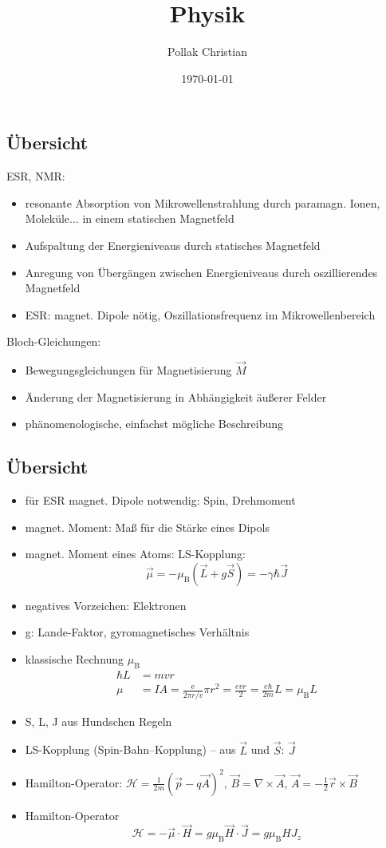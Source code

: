 \documentclass[
	a4paper,%
	twoside,%
	index=totoc,
	parskip=half,
 	chapterprefix,%
	headsepline,%
	13pt,%
	BCOR5mm,%
	fleqn,%
  openany,%
  ngerman
]{scrbook}
\title{Physik}
\author{Pollak Christian}
\date{\today}
\newcommand{\mb}{\mu_\mathrm{B}}
\begin{document}
	

\subsection{Übersicht}
ESR, NMR:
\begin{itemize}
\item resonante Absorption von Mikrowellenstrahlung durch paramagn. Ionen, Moleküle$\dots$ in einem statischen Magnetfeld
\item Aufspaltung der Energieniveaus durch statisches Magnetfeld
\item Anregung von Übergängen zwischen Energieniveaus durch oszillierendes Magnetfeld
\item ESR: magnet. Dipole nötig, Oszillationsfrequenz im Mikrowellenbereich
\end{itemize}

Bloch-Gleichungen:
\begin{itemize}
\item Bewegungsgleichungen für Magnetisierung $\vec M$
\item Änderung der Magnetisierung in Abhängigkeit äußerer Felder
\item phänomenologische, einfachst mögliche Beschreibung
\end{itemize}


\subsection{Übersicht}

\begin{itemize}
\item für ESR magnet. Dipole notwendig: Spin, Drehmoment
\item magnet. Moment: Maß für die Stärke eines Dipols
\item magnet. Moment eines Atoms: LS-Kopplung: 
\begin{equation}
\vec \mu = - \mb \left(\vec L + g \vec S\right) = -\gamma \hbar \vec J
\end{equation}
\item negatives Vorzeichen: Elektronen
\item g: Lande-Faktor, gyromagnetisches Verhältnis
\item klassische Rechnung $\mb$
\begin{align}
\hbar L &= m v r \\
\mu &= I A = \frac{\mathrm{e}}{2\pi r/v} \pi r^2 = \frac{evr}{2} = \frac{e \hbar}{2m} L = \mb L
\end{align}
\item S, L, J aus Hundschen Regeln
\item LS-Kopplung (Spin-Bahn--Kopplung) -- aus $\vec L$ und $\vec S$: $\vec J$
\item Hamilton-Operator: $\mathcal{H} = \frac{1}{2m} \left(\vec p - q\vec A \right)^2$, $\vec B = \nabla \times \vec A$, $\vec A = -\frac{1}{2} \vec r \times \vec B$
  \item Hamilton-Operator 
  \begin{equation}
  \mathcal{H} = -\vec\mu \cdot \vec H = g \mb \vec H \cdot \vec J = g\mb H J_z
  \end{equation}
\end{itemize}
\end{document}
